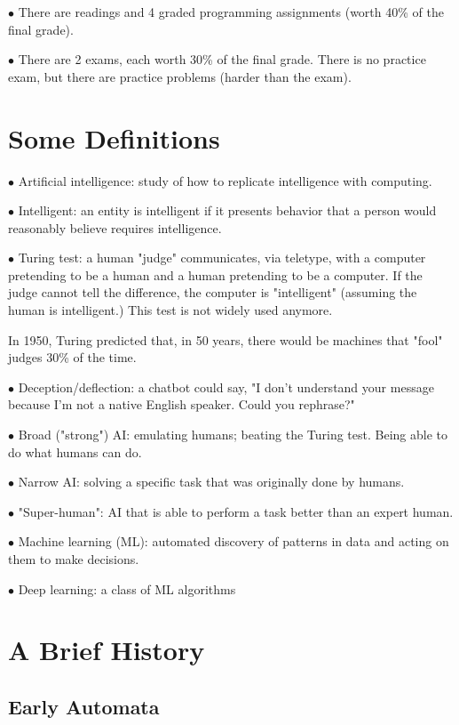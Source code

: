 \documentclass[english,openany]{book}
\begin{document}
    $\bullet$ There are readings and 4 graded programming assignments (worth 40\% of the final grade).

    $\bullet$ There are 2 exams, each worth 30\% of the final grade. There is no practice exam, but there are practice problems (harder than the exam).

    \section{Some Definitions}

    $\bullet$ Artificial intelligence: study of how to replicate intelligence with computing.

    $\bullet$ Intelligent: an entity is intelligent if it presents behavior that a person would reasonably believe requires intelligence.

    $\bullet$ Turing test: a human "judge" communicates, via teletype, with a computer pretending to be a human and a human pretending to be a computer. If the judge cannot tell the difference, the computer is "intelligent" (assuming the human is intelligent.) This test is not widely used anymore.

    In 1950, Turing predicted that, in 50 years, there would be machines that "fool" judges 30\% of the time.

    $\bullet$ Deception/deflection: a chatbot could say, "I don't understand your message because I'm not a native English speaker. Could you rephrase?"

    $\bullet$ Broad ("strong") AI: emulating humans; beating the Turing test. Being able to do what humans can do.

    $\bullet$ Narrow AI: solving a specific task that was originally done by humans.

    $\bullet$ "Super-human": AI that is able to perform a task better than an expert human.

    $\bullet$ Machine learning (ML): automated discovery of patterns in data and acting on them to make decisions.

    $\bullet$ Deep learning: a class of ML algorithms
    
    \section{A Brief History}
    
    
    \subsection{Early Automata}
    
\end{document}
